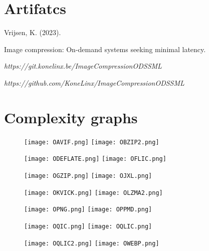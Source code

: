 \documentclass[11pt,a4paper]{report}
\begin{document}
\newpage
{}

\appendix

\chapter{Artifatcs\label{app:repo}}

Vrijsen, K. (2023).

Image compression: On-demand systems seeking minimal latency.

\textit{https://git.konelinx.be/ImageCompressionODSSML} 

\textit{https://github.com/KoneLinx/ImageCompressionODSSML}

\chapter{Complexity graphs\label{app:ographs}}

\begin{figure}[h!]
\centering
\texttt{[image: OAVIF.png]}
\texttt{[image: OBZIP2.png]}
\end{figure}

\begin{figure}[h!]
\centering
\texttt{[image: ODEFLATE.png]}
\texttt{[image: OFLIC.png]}
\end{figure}

\begin{figure}[h!]
\centering
\texttt{[image: OGZIP.png]}
\texttt{[image: OJXL.png]}
\end{figure}

\begin{figure}[h!]
\centering
\texttt{[image: OKVICK.png]}
\texttt{[image: OLZMA2.png]}
\end{figure}

\begin{figure}[h!]
\centering
\texttt{[image: OPNG.png]}
\texttt{[image: OPPMD.png]}
\end{figure}

\begin{figure}[h!]
\centering
\texttt{[image: OQIC.png]}
\texttt{[image: OQLIC.png]}
\end{figure}

\begin{figure}[h!]
\centering
\texttt{[image: OQLIC2.png]}
\texttt{[image: OWEBP.png]}
\end{figure}
\end{document}
